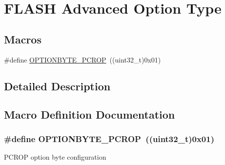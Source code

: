 \hypertarget{group___f_l_a_s_h_ex___advanced___option___type}{}\section{F\+L\+A\+SH Advanced Option Type}
\label{group___f_l_a_s_h_ex___advanced___option___type}
\subsection*{Macros}
\begin{DoxyCompactItemize}
\item 
\#define \hyperlink{group___f_l_a_s_h_ex___advanced___option___type_gade16326e09bd923b54f1ec8622a7bc4b}{O\+P\+T\+I\+O\+N\+B\+Y\+T\+E\+\_\+\+P\+C\+R\+OP}~((uint32\+\_\+t)0x01)
\end{DoxyCompactItemize}


\subsection{Detailed Description}


\subsection{Macro Definition Documentation}
\subsubsection[{\texorpdfstring{O\+P\+T\+I\+O\+N\+B\+Y\+T\+E\+\_\+\+P\+C\+R\+OP}{OPTIONBYTE_PCROP}}]{\setlength{\rightskip}{0pt plus 5cm}\#define O\+P\+T\+I\+O\+N\+B\+Y\+T\+E\+\_\+\+P\+C\+R\+OP~((uint32\+\_\+t)0x01)}\hypertarget{group___f_l_a_s_h_ex___advanced___option___type_gade16326e09bd923b54f1ec8622a7bc4b}{}\label{group___f_l_a_s_h_ex___advanced___option___type_gade16326e09bd923b54f1ec8622a7bc4b}
P\+C\+R\+OP option byte configuration 